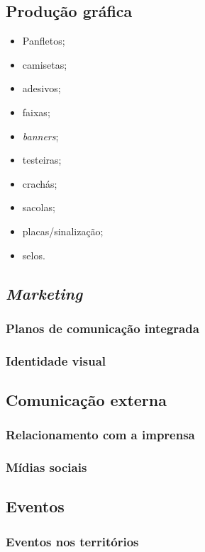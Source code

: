\subsection{Produção gráfica}

\begin{itemize}
	\item
	Panfletos;
	\item
	camisetas;
	\item
	adesivos;
	\item
	faixas;
	\item
	\emph{banners};
	\item
	testeiras;
	\item
	crachás;
	\item
	sacolas;
	\item
	placas/sinalização;
	\item
	selos.
\end{itemize}

\subsection{\emph{Marketing}}

\subsubsection{Planos de comunicação integrada}

\subsubsection{Identidade visual}

\subsection{Comunicação externa}

\subsubsection{Relacionamento com a imprensa}

\subsubsection{Mídias sociais}

\subsection{Eventos}

\subsubsection{Eventos nos territórios}
